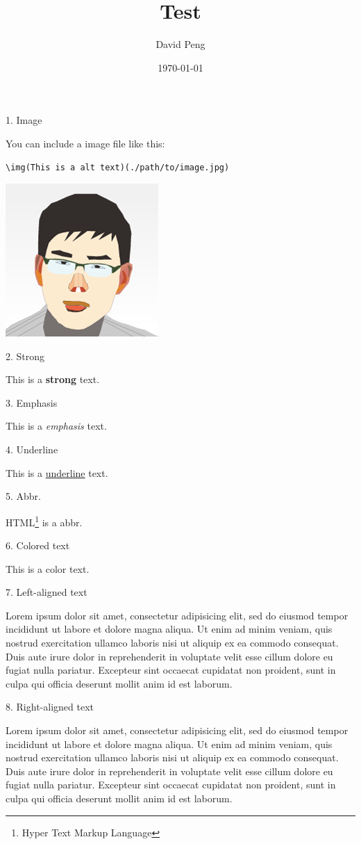 \documentclass[]{article}
\title{Test}
\author{David Peng}
\date{\today}
\begin{document}
\maketitle

1. Image

You can include a image file like this:

\begin{verbatim}
\img(This is a alt text)(./path/to/image.jpg)
\end{verbatim}

\includegraphics{avatar.png}

2. Strong

This is a \textbf{strong} text.

3. Emphasis

This is a \emph{emphasis} text.

4. Underline

This is a \underline{underline} text.

5. Abbr.

HTML\footnote{Hyper Text Markup Language} is a abbr.

6. Colored text

This is a  color text.

7. Left-aligned text

\begin{flushleft}
Lorem ipsum dolor sit amet, consectetur adipisicing elit, sed do eiusmod tempor incididunt ut labore et dolore magna aliqua. Ut enim ad minim veniam, quis nostrud exercitation ullamco laboris nisi ut aliquip ex ea commodo consequat. Duis aute irure dolor in reprehenderit in voluptate velit esse cillum dolore eu fugiat nulla pariatur. Excepteur sint occaecat cupidatat non proident, sunt in culpa qui officia deserunt mollit anim id est laborum.
\end{flushleft}

8. Right-aligned text

\begin{flushright}
Lorem ipsum dolor sit amet, consectetur adipisicing elit, sed do eiusmod tempor incididunt ut labore et dolore magna aliqua. Ut enim ad minim veniam, quis nostrud exercitation ullamco laboris nisi ut aliquip ex ea commodo consequat. Duis aute irure dolor in reprehenderit in voluptate velit esse cillum dolore eu fugiat nulla pariatur. Excepteur sint occaecat cupidatat non proident, sunt in culpa qui officia deserunt mollit anim id est laborum.
\end{flushright}
\end{document}
